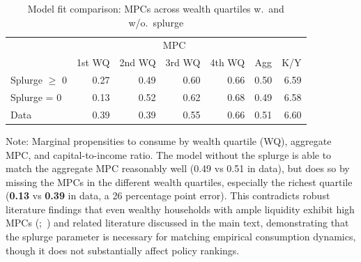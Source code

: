 \documentclass{econsocart}
\begin{document}
\begin{table}[tb] 
  \caption{\pregenmark Model fit comparison: MPCs across wealth quartiles w.\ and w/o.\ splurge}
  \label{tab:Comparison-Splurge-Table} %
  \centering

  \begin{tabular*}
    {\textwidth}{@{\extracolsep{\fill}}lrrrrrr@{}} 
    \hline
    & \multicolumn{5}{c}{MPC} & \\
    & \multicolumn{1}{c}{1st WQ} & \multicolumn{1}{c}{2nd WQ} & \multicolumn{1}{c}{3rd WQ} & \multicolumn{1}{c}{4th WQ} & \multicolumn{1}{c}{Agg} & \multicolumn{1}{c}{K/Y} \\ \hline
    Splurge $\geq$ 0      & 0.27 & 0.49 & 0.60 & 0.66 & 0.50 & 6.59 \\
    Splurge = 0           & 0.13 & 0.52 & 0.62 & 0.68 & 0.49 & 6.58 \\
    \addlinespace
    Data                  & 0.39 & 0.39 & 0.55 & 0.66 & 0.51 & 6.60 \\
    \hline
  \end{tabular*}

  \noindent\parbox{\textwidth}{
    \medskip
    \footnotesize Note: Marginal propensities to consume by wealth quartile (WQ), aggregate MPC, and capital-to-income ratio. The model without the splurge is able to match the aggregate MPC reasonably well (0.49 vs 0.51 in data), but does so by missing the MPCs in the different wealth quartiles, especially the richest quartile (\textbf{0.13} vs \textbf{0.39} in data, a 26 percentage point error). This contradicts robust literature findings that even wealthy households with ample liquidity exhibit high MPCs (\cite{crawley2023MicroMacro};~\cite{graham2026mental}) and related literature discussed in the main text, demonstrating that the splurge parameter is necessary for matching empirical consumption dynamics, though it does not substantially affect policy rankings.
  }
\end{table}

\vspace{0.5em}
\end{document}
